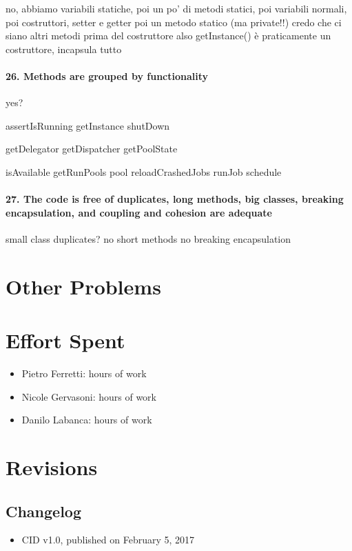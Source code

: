\documentclass[english]{article}
\begin{document}
no, abbiamo variabili statiche, poi un po' di metodi statici, poi variabili normali, poi costruttori, setter e getter poi un metodo statico (ma private!!)
credo che ci siano altri metodi prima del costruttore
also getInstance() è praticamente un costruttore, incapsula tutto

\paragraph{26. Methods are grouped by functionality}
yes?

assertIsRunning
getInstance
shutDown

getDelegator
getDispatcher
getPoolState

isAvailable
getRunPools
pool
reloadCrashedJobs
runJob
schedule

\paragraph{27. The code is free of duplicates, long methods, big classes, breaking encapsulation, and coupling and cohesion are adequate}
small class
duplicates? no
short methods
no breaking encapsulation



\section{Other Problems} %


\section{Effort Spent}
\begin{itemize}
	\item{Pietro Ferretti:  hours of work}
	\item{Nicole Gervasoni:  hours of work}
	\item{Danilo Labanca:  hours of work}
\end{itemize}


\section{Revisions}

\subsection{Changelog}
\begin{itemize}
	\item{CID v1.0, published on February 5, 2017}
\end{itemize}
\end{document}
